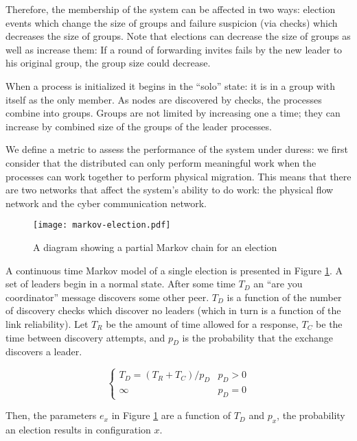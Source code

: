 Therefore, the membership of the system can be affected in two ways: election events which change the size of groups and failure suspicion (via checks) which decreases the size of groups. Note that elections can decrease the size of groups as well as increase them: If a round of forwarding invites fails by the new leader to his original group, the group size could decrease.

When a process is initialized it begins in the ``solo'' state: it is in a group with itself as the only member. As nodes are discovered by checks, the processes combine into groups. Groups are not limited by increasing one a time; they can increase by combined size of the groups of the leader processes.

We define a metric to assess the performance of the system under duress: we first consider that the distributed can only perform meaningful work when the processes can work together to perform physical migration. This means that there are two networks that affect the system's ability to do work: the physical flow network and the cyber communication network.

\begin{figure}[!h]
\centering
\texttt{[image: markov-election.pdf]}
\caption{A diagram showing a partial Markov chain for an election}
\label{fig:MARKOVELECTION}
\end{figure}

A continuous time Markov model of a single election is presented in Figure \ref{fig:MARKOVELECTION}.
A set of leaders begin in a normal state. After some time $T_{D}$ an ``are you coordinator'' message discovers some other peer. $T_{D}$ is a function of the number of discovery checks which discover no leaders (which in turn is a function of the link reliability). Let $T_{R}$ be the amount of time allowed for a response, $T_{C}$ be the time between discovery attempts, and $p_{D}$ is the probability that the exchange discovers a leader.

\begin{equation}
\begin{cases}
T_{D} = ( T_{R}+T_{C} ) / p_{D} & p_{D} > 0 \\
\infty & p_{D} = 0
\end{cases}
\end{equation}

Then, the parameters $e_x$ in Figure \ref{fig:MARKOVELECTION} are a function of $T_{D}$ and $p_{x}$, the probability an election results in configuration $x$.

